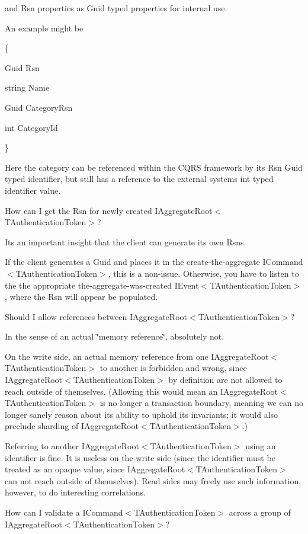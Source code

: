 and Rsn properties as Guid typed properties for internal use. 

An example might be 

\{ 

Guid Rsn 

string Name 

Guid Category\+Rsn 

int Category\+Id 

\} 

Here the category can be referenced within the C\+Q\+RS framework by it\textquotesingle{}s Rsn Guid typed identifier, but still has a reference to the external systems int typed identifier value. 

How can I get the Rsn for newly created I\+Aggregate\+Root$<$\+T\+Authentication\+Token$>$? 

It\textquotesingle{}s an important insight that the client can generate its own Rsns. 

If the client generates a Guid and places it in the create-\/the-\/aggregate I\+Command$<$\+T\+Authentication\+Token$>$, this is a non-\/issue. Otherwise, you have to listen to the the appropriate the-\/aggregate-\/was-\/created I\+Event$<$\+T\+Authentication\+Token$>$, where the Rsn will appear be populated. 

Should I allow references between I\+Aggregate\+Root$<$\+T\+Authentication\+Token$>$? 

In the sense of an actual \char`\"{}memory reference\char`\"{}, absolutely not. 

On the write side, an actual memory reference from one I\+Aggregate\+Root$<$\+T\+Authentication\+Token$>$ to another is forbidden and wrong, since I\+Aggregate\+Root$<$\+T\+Authentication\+Token$>$ by definition are not allowed to reach outside of themselves. (Allowing this would mean an I\+Aggregate\+Root$<$\+T\+Authentication\+Token$>$ is no longer a transaction boundary, meaning we can no longer sanely reason about its ability to uphold its invariants; it would also preclude sharding of I\+Aggregate\+Root$<$\+T\+Authentication\+Token$>$.) 

Referring to another I\+Aggregate\+Root$<$\+T\+Authentication\+Token$>$ using an identifier is fine. It is useless on the write side (since the identifier must be treated as an opaque value, since I\+Aggregate\+Root$<$\+T\+Authentication\+Token$>$ can not reach outside of themselves). Read sides may freely use such information, however, to do interesting correlations. 

How can I validate a I\+Command$<$\+T\+Authentication\+Token$>$ across a group of I\+Aggregate\+Root$<$\+T\+Authentication\+Token$>$? 

